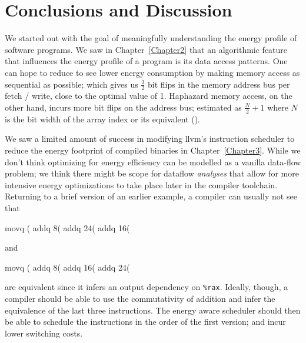 \chapter{Conclusions and Discussion}

\label{Chapter4}


We started out with the goal of meaningfully understanding the energy
profile of software programs.  We saw in Chapter~\ref{Chapter2} that
an algorithmic feature that influences the energy profile of a program
is its data access patterns.  One can hope to reduce to see lower
energy consumption by making memory access as sequential as possible;
which gives us $\frac{3}{2}$ bit flips in the memory address bus per
fetch / write, close to the optimal value of 1.  Haphazard memory
access, on the other hand, incurs more bit flips on the address bus;
estimated as $\frac{N}{2} + 1$ where $N$ is the bit width of the array
index or its equivalent ().

We saw a limited amount of success in modifying llvm's instruction
scheduler to reduce the energy footprint of compiled binaries in
Chapter~\ref{Chapter3}.  While we don't think optimizing for energy
efficiency can be modelled as a vanilla data-flow problem; we think
there might be scope for dataflow \textit{analyses} that allow for
more intensive energy optimizations to take place later in the
compiler toolchain.  Returning to a brief version of an earlier
example, a compiler can usually not see that

\begin{gascode}
  movq    (%
  addq    8(%
  addq    24(%
  addq    16(%
\end{gascode}

and

\begin{gascode}
  movq    (%
  addq    8(%
  addq    16(%
  addq    24(%
\end{gascode}

are equivalent since it infers an output dependency on \texttt{\%rax}.
Ideally, though, a compiler should be able to use the commutativity of
addition and infer the equivalence of the last three instructions.
The energy aware scheduler should then be able to schedule the
instructions in the order of the first version; and incur lower
switching costs.
